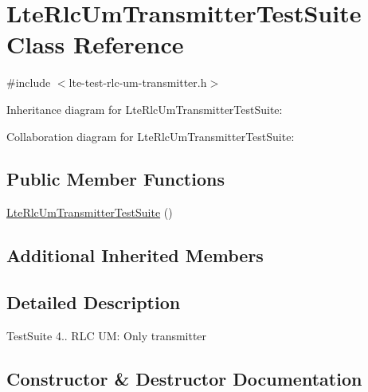 \hypertarget{classLteRlcUmTransmitterTestSuite}{}\section{Lte\+Rlc\+Um\+Transmitter\+Test\+Suite Class Reference}
\label{classLteRlcUmTransmitterTestSuite}


{\ttfamily \#include $<$lte-\/test-\/rlc-\/um-\/transmitter.\+h$>$}



Inheritance diagram for Lte\+Rlc\+Um\+Transmitter\+Test\+Suite\+:


Collaboration diagram for Lte\+Rlc\+Um\+Transmitter\+Test\+Suite\+:
\subsection*{Public Member Functions}
\begin{DoxyCompactItemize}
\item 
\hyperlink{classLteRlcUmTransmitterTestSuite_ad34290069b8a01c5f5e6a56bf0d092bb}{Lte\+Rlc\+Um\+Transmitter\+Test\+Suite} ()
\end{DoxyCompactItemize}
\subsection*{Additional Inherited Members}


\subsection{Detailed Description}
Test\+Suite 4.. R\+LC UM\+: Only transmitter 

\subsection{Constructor \& Destructor Documentation}
